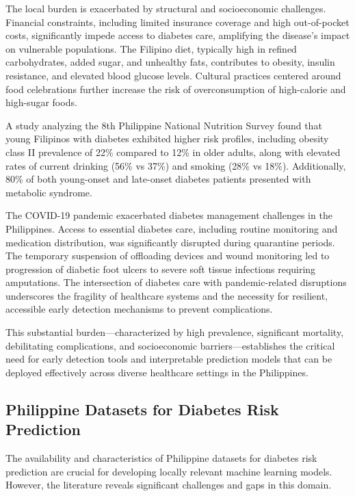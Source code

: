 The local burden is exacerbated by structural and socioeconomic challenges. Financial constraints, including limited insurance coverage and high out-of-pocket costs, significantly impede access to diabetes care, amplifying the disease's impact on vulnerable populations. The Filipino diet, typically high in refined carbohydrates, added sugar, and unhealthy fats, contributes to obesity, insulin resistance, and elevated blood glucose levels. Cultural practices centered around food celebrations further increase the risk of overconsumption of high-calorie and high-sugar foods.

A study analyzing the 8th Philippine National Nutrition Survey found that young Filipinos with diabetes exhibited higher risk profiles, including obesity class II prevalence of 22\% compared to 12\% in older adults, along with elevated rates of current drinking (56\% vs 37\%) and smoking (28\% vs 18\%). Additionally, 80\% of both young-onset and late-onset diabetes patients presented with metabolic syndrome.

The COVID-19 pandemic exacerbated diabetes management challenges in the Philippines. Access to essential diabetes care, including routine monitoring and medication distribution, was significantly disrupted during quarantine periods. The temporary suspension of offloading devices and wound monitoring led to progression of diabetic foot ulcers to severe soft tissue infections requiring amputations. The intersection of diabetes care with pandemic-related disruptions underscores the fragility of healthcare systems and the necessity for resilient, accessible early detection mechanisms to prevent complications.

This substantial burden—characterized by high prevalence, significant mortality, debilitating complications, and socioeconomic barriers—establishes the critical need for early detection tools and interpretable prediction models that can be deployed effectively across diverse healthcare settings in the Philippines.

\subsection{Philippine Datasets for Diabetes Risk Prediction}

The availability and characteristics of Philippine datasets for diabetes risk prediction are crucial for developing locally relevant machine learning models. However, the literature reveals significant challenges and gaps in this domain.

